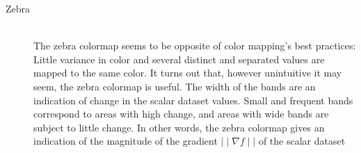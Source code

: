 \begin{description}
			\item[Zebra] ~\\
			The zebra colormap seems to be opposite of color mapping's best practices: Little variance in color and several distinct and separated values are mapped to the same color.
			It turns out that, however unintuitive it may seem, the zebra colormap is useful.
			The width of the bands are an indication of change in the scalar dataset values.
			Small and frequent bands correspond to areas with high change, and areas with wide bands are subject to little change.
			In other words, the zebra colormap gives an indication of the magnitude of the gradient \(\mid\mid\nabla f\mid\mid\) of the scalar dataset\cite[p. 156]{telea2014data}
			\begin{figure}[htb]
				\centering
\end{figure}
\end{description}
